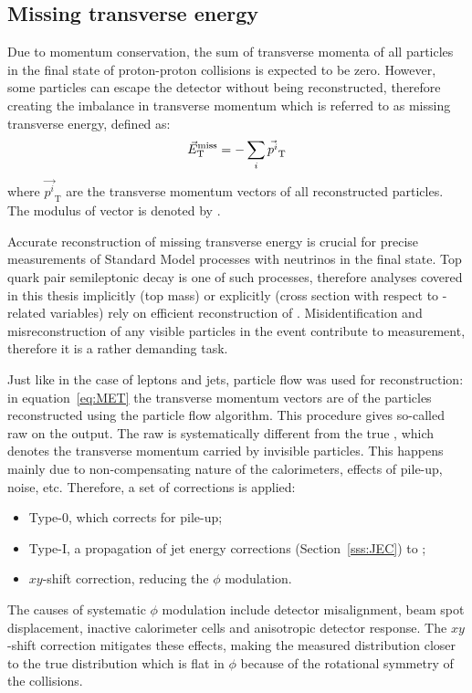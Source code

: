 \subsection{Missing transverse energy}
\label{ss:MET_reconstruction}
Due to momentum conservation, the sum of transverse momenta of all particles in the final state of proton-proton
collisions is expected to be zero. However, some particles can escape the detector without being reconstructed,
therefore creating the imbalance in transverse momentum which is referred to as missing transverse energy, defined as:
\begin{equation}
\label{eq:MET}
\vec{E}_\mathrm{T}^\textrm{miss} = - \sum_i \vec{p^i}_\mathrm{T}
\end{equation}
where $\vec{p^i}_\mathrm{T}$ are the transverse momentum vectors of all reconstructed particles. The modulus of
\METvec vector is denoted by \MET.

Accurate reconstruction of missing transverse energy is crucial for precise measurements of Standard Model processes
with neutrinos in the final state. Top quark pair semileptonic decay is one of such processes, therefore analyses
covered in this thesis implicitly (top mass) or explicitly (\ttbar cross section with respect to \MET-related variables)
rely on efficient reconstruction of \METvec. Misidentification and misreconstruction of any visible particles in the
event contribute to \METvec measurement, therefore it is a rather demanding task.

Just like in the case of leptons and jets, particle flow was used for \METvec reconstruction: in equation~\ref{eq:MET}
the transverse momentum vectors are of the particles reconstructed using the particle flow algorithm. This procedure
gives so-called raw \METvec on the output. The raw \METvec is systematically different from the true \METvec, which
denotes the transverse momentum carried by invisible particles. This happens mainly due to non-compensating nature of
the calorimeters, effects of pile-up, noise, etc. Therefore, a set of corrections is applied:
\begin{itemize}
 \item Type-0, which corrects \MET for pile-up;
 \item Type-I, a propagation of jet energy corrections (Section~\ref{sss:JEC}) to \MET;
 \item $xy$-shift correction, reducing the \METvec $\phi$ modulation.
\end{itemize}

The causes of systematic \METvec $\phi$ modulation include detector misalignment, beam spot displacement, inactive
calorimeter cells and anisotropic detector response. The $xy$-shift correction mitigates these effects, making the
measured \METvec distribution closer to the true \METvec distribution which is flat in $\phi$ because of the rotational
symmetry of the collisions.


